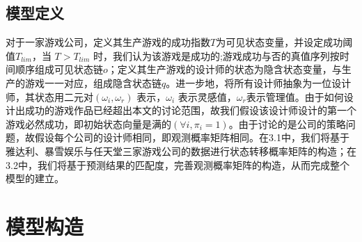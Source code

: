 \documentclass[hyperref]{ctexart}
\begin{document}
\begin{multicols}{2}
    \subsection{模型定义}
    对于一家游戏公司，定义其生产游戏的成功指数$T$为可见状态变量，并设定成功阈值$T_{lim}$，当 $T > T_{lim}$ 时，我们认为该游戏是成功的;游戏成功与否的真值序列按时间顺序组成可见状态链$o$；定义其生产游戏的设计师的状态为隐含状态变量，与生产的游戏一一对应，组成隐含状态链$q$。进一步地，将所有设计师抽象为一位设计师，其状态用二元对$(\omega_i, \omega_r)$  表示，$\omega_i$  表示灵感值，$\omega_r$表示管理值。由于如何设计出成功的游戏作品已经超出本文的讨论范围，故我们假设该设计师设计的第一个游戏必然成功，即初始状态向量是满的$(\forall i, \pi_i = 1)$。由于讨论的是公司的策略问题，故假设每个公司的设计师相同，即观测概率矩阵相同。在3.1中，我们将基于雅达利、暴雪娱乐与任天堂三家游戏公司的数据进行状态转移概率矩阵的构造；在3.2中，我们将基于预测结果的匹配度，完善观测概率矩阵的构造，从而完成整个模型的建立。
    
    
	\section{模型构造}

\end{multicols}
\end{document}

